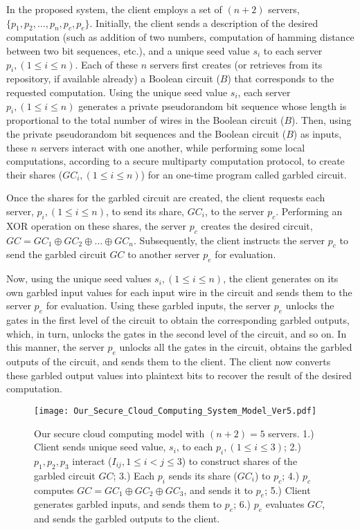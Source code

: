 \documentclass[10pt,journal,cspaper,compsoc]{IEEEtran}
\begin{document}
In the proposed system, the client employs a set of $(n+2)$ servers, $\{p_1, p_2, \ldots, p_n, p_c, p_e\}$. Initially, the client sends a description of the desired computation (such as addition of two numbers, computation of hamming distance between two bit sequences, etc.), and a unique seed value $s_i$ to each server $p_i, (1\le i\le n)$. Each of these $n$ servers first creates (or retrieves from its repository, if available already) a Boolean circuit ($B$) that corresponds to the requested computation. Using the unique seed value $s_i$, each server $p_i, (1\le i\le n)$ generates a private pseudorandom bit sequence whose length is proportional to the total number of wires in the Boolean circuit ($B$). Then, using the private pseudorandom bit sequences and the Boolean circuit ($B$) as inputs, these $n$ servers interact with one another, while performing some local computations, according to a secure multiparty computation protocol, to create their shares ($GC_i, (1\le i\le n)$) for an one-time program called garbled circuit.


Once the shares for the garbled circuit are created, the client requests each server, $p_i, (1\le i\le n)$, to send its share, $GC_i$, to the server $p_c$. Performing an XOR operation on these shares, the server $p_c$ creates the desired circuit, $GC = GC_1\oplus GC_2\oplus \ldots \oplus GC_n$. Subsequently, the client instructs the server $p_c$ to send the garbled circuit $GC$ to another server $p_e$ for evaluation.



Now, using the unique seed values $s_i, (1\le i\le n)$, the client generates on its own garbled input values for each input wire in the circuit and sends them to the server $p_e$ for evaluation. Using these garbled inputs, the server $p_e$ unlocks the gates in the first level of the circuit to obtain the corresponding garbled outputs, which, in turn, unlocks the gates in the second level of the circuit, and so on. In this manner, the server $p_e$ unlocks all the gates in the circuit, obtains the garbled outputs of the circuit, and sends them to the client. The client now converts these garbled output values into plaintext bits to recover the result of the desired computation.


\begin{figure}[t]
\centering
\texttt{[image: Our\_Secure\_Cloud\_Computing\_System\_Model\_Ver5.pdf]}
\vspace{-3 mm}
\caption{Our secure cloud computing model with $(n+2)=5$ servers. 1.) Client sends unique seed value, $s_i$, to each $p_i, (1\le i\le 3)$; 2.) $p_1,p_2,p_3$ interact ($I_{ij}, 1\le i<j\le 3$) to construct shares of the garbled circuit $GC$; 3.) Each $p_i$ sends its share ($GC_i$) to $p_c$; 4.) $p_c$ computes $GC=GC_1\oplus GC_2\oplus GC_3$, and sends it to $p_e$; 5.) Client generates garbled inputs, and sends them to $p_e$; 6.) $p_e$ evaluates $GC$, and sends the garbled outputs to the client.\vspace{-4 mm}}
\label{fig_our_secure_cloud_computing_Model}
\end{figure}
\end{document}
